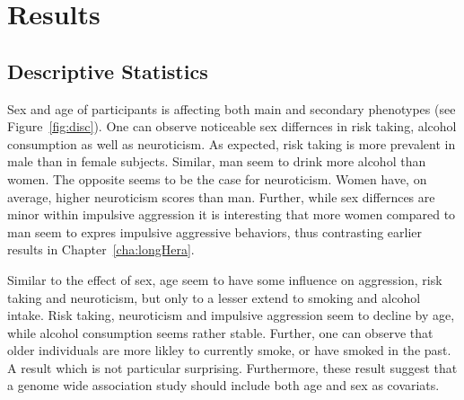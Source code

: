 \section{Results}
\label{sec:results_ukb_assoc}

\subsection{Descriptive Statistics}
\label{sub:descriptive_statistics}

Sex and age of participants is affecting both main and secondary phenotypes (see Figure~\ref{fig:disc}).
One can observe noticeable sex differnces in risk taking, alcohol consumption as well as neuroticism.
As expected, risk taking is more prevalent in male than in female subjects. 
Similar, man seem to drink more alcohol than women.
The opposite seems to be the case for neuroticism.
Women have, on average, higher neuroticism scores than man.
Further,  while sex differnces are minor within impulsive aggression it is interesting that more women compared to man seem to expres impulsive aggressive behaviors, thus contrasting earlier results in Chapter~\ref{cha:longHera}. 

Similar to the effect of sex, age seem to have some influence on aggression, risk taking and neuroticism, but only to a lesser extend to smoking and alcohol intake.
Risk taking, neuroticism and impulsive aggression seem to decline by age, while alcohol consumption seems rather stable.
Further, one can observe that older individuals are more likley to currently smoke, or have smoked in the past.
A result which is not particular surprising.
Furthermore, these result suggest that a genome wide association study should include both age and sex as covariats.

